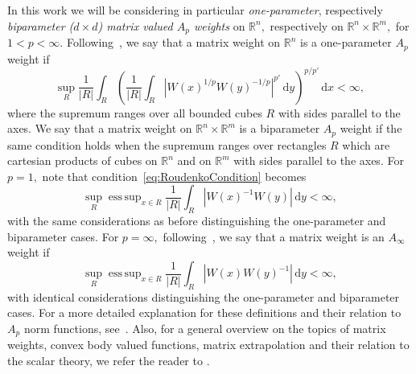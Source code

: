 \documentclass{article}
\theoremstyle{definition}
\theoremstyle{remark}
\numberwithin{equation}{section}
\DeclareMathOperator*{\esssup}{ess\,sup}
\newcommand{\reals}{\mathbb{R}}
\newcommand{\1}{\mathbf{1}}
\begin{document}
    In this work we will be considering in particular \emph{one-parameter}, respectively \emph{biparameter ($d\times d$) matrix valued $A_p$ weights} on $\reals^n,$ respectively on $\reals^n\times\reals^m,$ for $1<p<\infty.$
    Following~\cite{Roudenko2002}, we say that a matrix weight on $\reals^n$ is a one-parameter $A_p$ weight if
    \begin{equation}
        \label{eq:RoudenkoCondition}
        \sup_{R}\frac{1}{|R|}\int_{R}\left(\frac{1}{|R|}\int_{R}|W(x)^{1/p}W(y)^{-1/p}|^{p'}\,\mathrm{d}y\right)^{p/p'}\,\mathrm{d}x
        < \infty,
    \end{equation}
    where the supremum ranges over all bounded cubes $R$ with sides parallel to the axes.
    We say that a matrix weight on $\reals^n \times \reals^m$ is a biparameter
    $A_p$ weight if the same condition holds
    when the supremum ranges over rectangles $R$  which are cartesian products
    of cubes on $\reals^n$ and on $\reals^m$ with sides parallel to the axes.
    For $p = 1,$ note that condition~\eqref{eq:RoudenkoCondition} becomes
    \begin{equation*}
        \sup_{R} \esssup_{x \in R} \frac{1}{|R|}\int_{R} |W(x)^{-1}W(y)|\,\mathrm{d}y
        < \infty,
    \end{equation*}
    with the same considerations as before distinguishing the one-parameter and biparameter cases.
    For $p = \infty,$ following~\cite{Cruz_Uribe_Bownik_Extrapolation},
    we say that a matrix weight is an $A_\infty$ weight if
    \begin{equation*}
        \sup_{R} \esssup_{x \in R} \frac{1}{|R|}\int_{R} |W(x)W(y)^{-1}|\,\mathrm{d}y
        < \infty,
    \end{equation*}
    with identical considerations distinguishing the one-parameter and biparameter cases.
    For a more detailed explanation for these definitions
    and their relation to $A_p$ norm functions, see~\cite[Section~6]{Cruz_Uribe_Bownik_Extrapolation}.
    Also, for a general overview on the topics of matrix weights,
    convex body valued functions, matrix extrapolation
    and their relation to the scalar theory, we refer the reader to
    \cite{CruzUribe2025}.
    
\end{document}
